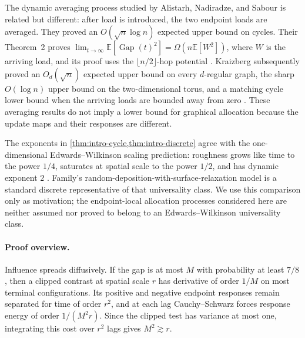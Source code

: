 \documentclass[11pt]{article}
\theoremstyle{remark}
\newcommand{\E}{\mathbb{E}}
\newcommand{\Gap}{\operatorname{Gap}}
\begin{document}
The dynamic averaging process studied by Alistarh, Nadiradze, and Sabour is related but different: after load is introduced, the two endpoint loads are averaged. They proved an $O(\sqrt n\log n)$ expected upper bound on cycles. Their Theorem~2 proves $\lim_{t\to\infty}\E[\Gap(t)^2]=\Omega(n\E[W^2])$, where $W$ is the arriving load, and its proof uses the $\lfloor n/2\rfloor$-hop potential \cite[Theorem~2]{AlistarhNadiradzeSabour2022}. Kraizberg subsequently proved an $O_d(\sqrt n)$ expected upper bound on every $d$-regular graph, the sharp $O(\log n)$ upper bound on the two-dimensional torus, and a matching cycle lower bound when the arriving loads are bounded away from zero \cite{Kraizberg2026}. These averaging results do not imply a lower bound for graphical allocation because the update maps and their responses are different.

The exponents in \cref{thm:intro-cycle,thm:intro-discrete} agree with the one-dimensional Edwards--Wilkinson scaling prediction: roughness grows like time to the power $1/4$, saturates at spatial scale to the power $1/2$, and has dynamic exponent $2$ \cite{EdwardsWilkinson1982,FamilyVicsek1985,Family1986}. Family's random-deposition-with-surface-relaxation model is a standard discrete representative of that universality class. We use this comparison only as motivation; the endpoint-local allocation processes considered here are neither assumed nor proved to belong to an Edwards--Wilkinson universality class.

\paragraph{Proof overview.}
Influence spreads diffusively. If the gap is at most $M$ with probability at least $7/8$, then a clipped contrast at spatial scale $r$ has derivative of order $1/M$ on most terminal configurations. Its positive and negative endpoint responses remain separated for time of order $r^2$, and at each lag Cauchy--Schwarz forces response energy of order $1/(M^2r)$. Since the clipped test has variance at most one, integrating this cost over $r^2$ lags gives $M^2\gtrsim r$.
\end{document}
